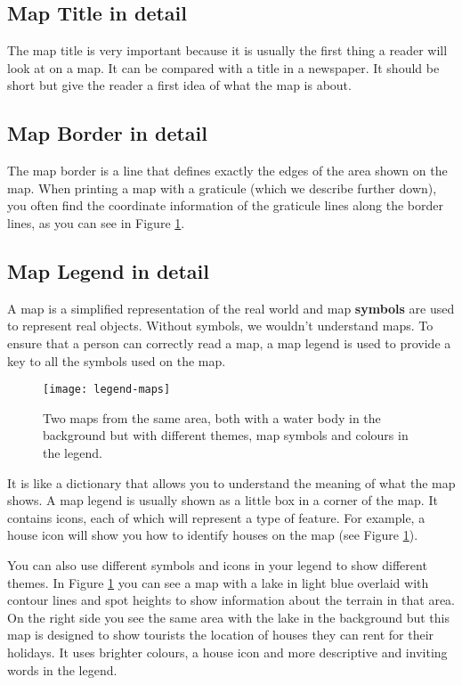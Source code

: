 \subsection{Map Title in detail}

The map title is very important because it is usually the first thing a
reader will look at on a map. It can be compared with a title in a newspaper.
It should be short but give the reader a first idea of what the map is about.

\subsection{Map Border in detail}

The map border is a line that defines exactly the edges of the area shown on
the map. When printing a map with a graticule (which we describe further
down), you often find the coordinate information of the graticule lines along
the border lines, as you can see in Figure \ref{fig:maplegends}.
  
\subsection{Map Legend in detail}

A map is a simplified representation of the real world and map
\textbf{symbols} are
used to represent real objects. Without symbols, we wouldn't understand maps.
To ensure that a person can correctly read a map, a map legend is used to
provide a key to all the symbols used on the map. 

\begin{figure}[ht]
   \begin{center}
   \caption{Two maps from the same area, both with a water body in the
background but with different themes, map symbols and colours in the legend.}
\label{fig:maplegends}\smallskip
   \texttt{[image: legend-maps]}
\end{center}
\end{figure}

It is like a dictionary
that allows you to understand the meaning of what the map shows. A map legend
is usually shown as a little box in a corner of the map. It contains icons,
each of which will represent a type of feature. For example, a house icon
will show you how to identify houses on the map (see Figure
\ref{fig:maplegends}). 

You can also use different symbols and icons in your legend to show different
themes. In Figure \ref{fig:maplegends} you can see a map with a lake in light
blue
overlaid with contour lines and spot heights to show information about the
terrain in that area. On the right side you see the same area with the lake
in the background but this map is designed to show tourists the location of
houses they can rent for their holidays. It uses brighter colours, a house
icon and more descriptive and inviting words in the legend. 

